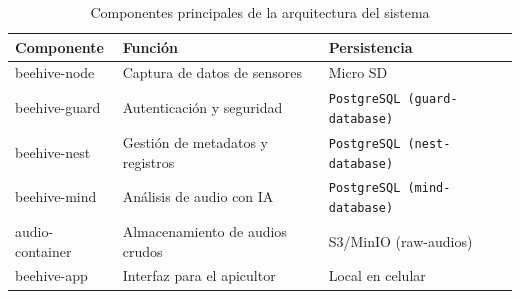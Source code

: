 \begin{table}[H]
    \centering
    \caption{Componentes principales de la arquitectura del sistema}
    \begin{tabular}{@{}lll@{}}
        \toprule
        Componente & Función & Persistencia \\ \midrule
        beehive-node & Captura de datos de sensores & Micro SD \\
        beehive-guard & Autenticación y seguridad & \texttt{PostgreSQL (guard-database)} \\
        beehive-nest & Gestión de metadatos y registros & \texttt{PostgreSQL (nest-database)} \\
        beehive-mind & Análisis de audio con IA & \texttt{PostgreSQL (mind-database)} \\
        audio-container & Almacenamiento de audios crudos &  S3/MinIO (raw-audios) \\
        beehive-app & Interfaz para el apicultor & Local en celular \\ \bottomrule
    \end{tabular}
    \label{tab:componentes_sistema}
\end{table}